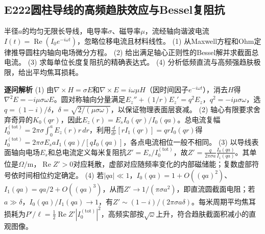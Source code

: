 \subsection*{E222\quad 圆柱导线的高频趋肤效应与Bessel复阻抗}
半径$a$的均匀无限长导线，电导率$\sigma$、磁导率$\mu$，流经轴向谐波电流$I(t)=\operatorname{Re}(I_0e^{-i\omega t})$，忽略位移电流且材料线性。
(1) 从Maxwell方程和Ohm定律推导圆柱内轴向电场微分方程。
(2) 给出满足轴心正则性的Bessel解并求截面总电流。
(3) 求每单位长度复阻抗的精确表达式。
(4) 分析低频直流与高频强趋肤极限，给出平均焦耳损耗。
\par\textbf{逐问解析}
(1) 由$\nabla\times H=\sigma E$和$\nabla\times E=i\omega\mu H$（因时间因子$e^{-i\omega t}$），消去$H$得$\nabla^2E=-i\mu\sigma\omega E$。圆对称轴向分量满足$E_z''+(1/r)E_z'=q^2E_z$，$q^2=-i\mu\sigma\omega$，选$q=(1-i)/\delta$，$\delta=\sqrt{2/(\mu\sigma\omega)}$，以保证物理表面层衰减。
(2) 轴心有限要求舍弃奇异的$K_0(qr)$，因此$E_z(r)=E_s I_0(qr)/I_0(qa)$。总电流复幅$I_0^{(\mathrm{tot})}=2\pi\sigma\int_0^a E_z(r)r\,dr$，利用$\frac{d}{dr}[rI_1(qr)]=qrI_0(qr)$得$I_0^{(\mathrm{tot})}=2\pi\sigma E_sa I_1(qa)/[qI_0(qa)]$，各点电流相位一般不相同。
(3) 以导线表面轴向电场$E_s$和总电流定义每米复阻抗$Z'=E_s/I_0^{(\mathrm{tot})}$，故$Z'=\frac q{2\pi\sigma a}\frac{I_0(qa)}{I_1(qa)}$。其单位是$\Omega/\mathrm m$，$\operatorname{Re}Z'>0$对应耗散，虚部对应随频率变化的内部磁储能；复数虚部符号依时间相位约定确定。
(4) 若$|qa|\ll1$，$I_0(qa)=1+O((qa)^2)$、$I_1(qa)=qa/2+O((qa)^3)$，从而$Z'\to1/(\pi\sigma a^2)$，即直流圆截面电阻；若$a\gg\delta$，$I_0(qa)/I_1(qa)\to1$，有$Z'\sim(1-i)/(2\pi\sigma a\delta)$。每米周期平均焦耳损耗为$P'/\ell=\tfrac12\operatorname{Re}Z'|I_0^{(\mathrm{tot})}|^2$，高频实部按$\sqrt\omega$上升，符合趋肤截面积减小的直观图像。
\par\medskip
